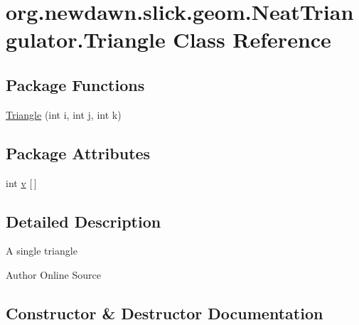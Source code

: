 \hypertarget{classorg_1_1newdawn_1_1slick_1_1geom_1_1_neat_triangulator_1_1_triangle}{}\section{org.\+newdawn.\+slick.\+geom.\+Neat\+Triangulator.\+Triangle Class Reference}
\label{classorg_1_1newdawn_1_1slick_1_1geom_1_1_neat_triangulator_1_1_triangle}
\subsection*{Package Functions}
\begin{DoxyCompactItemize}
\item 
\mbox{\hyperlink{classorg_1_1newdawn_1_1slick_1_1geom_1_1_neat_triangulator_1_1_triangle_a135be0fe8dae5f6ee6da81b1a372284b}{Triangle}} (int i, int j, int k)
\end{DoxyCompactItemize}
\subsection*{Package Attributes}
\begin{DoxyCompactItemize}
\item 
int \mbox{\hyperlink{classorg_1_1newdawn_1_1slick_1_1geom_1_1_neat_triangulator_1_1_triangle_a2b3db61035c03f006545b890dccf89a0}{v}} \mbox{[}$\,$\mbox{]}
\end{DoxyCompactItemize}


\subsection{Detailed Description}
A single triangle

\begin{DoxyAuthor}{Author}
Online Source 
\end{DoxyAuthor}


\subsection{Constructor \& Destructor Documentation}
\mbox{\label{classorg_1_1newdawn_1_1slick_1_1geom_1_1_neat_triangulator_1_1_triangle_a135be0fe8dae5f6ee6da81b1a372284b}} 
